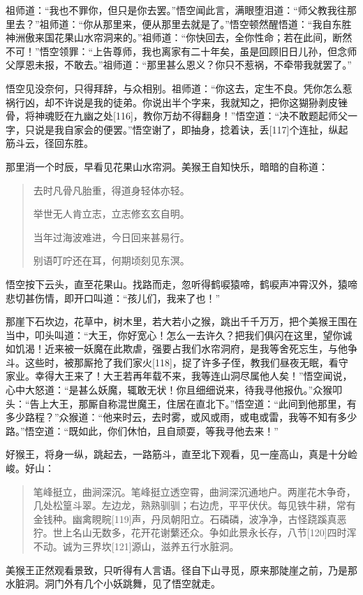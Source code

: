 \documentclass[12pt,UTF8]{ctexbook}
\begin{document}
祖师道：“我也不罪你，但只是你去罢。”悟空闻此言，满眼堕泪道：“师父教我往那里去？”祖师道：“你从那里来，便从那里去就是了。”悟空顿然醒悟道：“我自东胜神洲傲来国花果山水帘洞来的。”祖师道：“你快回去，全你性命；若在此间，断然不可！”悟空领罪：“上告尊师，我也离家有二十年矣，虽是回顾旧日儿孙，但念师父厚恩未报，不敢去。”祖师道：“那里甚么恩义？你只不惹祸，不牵带我就罢了。”

悟空见没奈何，只得拜辞，与众相别。祖师道：“你这去，定生不良。凭你怎么惹祸行凶，却不许说是我的徒弟。你说出半个字来，我就知之，把你这猢狲剥皮锉骨，将神魂贬在九幽之处[116]，教你万劫不得翻身！”悟空道：“决不敢题起师父一字，只说是我自家会的便罢。”悟空谢了，即抽身，捻着诀，丢[117]个连扯，纵起筋斗云，径回东胜。

那里消一个时辰，早看见花果山水帘洞。美猴王自知快乐，暗暗的自称道：
\begin{quotation}
去时凡骨凡胎重，得道身轻体亦轻。

举世无人肯立志，立志修玄玄自明。

当年过海波难进，今日回来甚易行。

别语叮咛还在耳，何期顷刻见东溟。
\end{quotation}
悟空按下云头，直至花果山。找路而走，忽听得鹤唳猿啼，鹤唳声冲霄汉外，猿啼悲切甚伤情，即开口叫道：“孩儿们，我来了也！”

那崖下石坎边，花草中，树木里，若大若小之猴，跳出千千万万，把个美猴王围在当中，叩头叫道：“大王，你好宽心！怎么一去许久？把我们俱闪在这里，望你诚如饥渴！近来被一妖魔在此欺虐，强要占我们水帘洞府，是我等舍死忘生，与他争斗。这些时，被那厮抢了我们家火[118]，捉了许多子侄，教我们昼夜无眠，看守家业。幸得大王来了！大王若再年载不来，我等连山洞尽属他人矣！”悟空闻说，心中大怒道：“是甚么妖魔，辄敢无状！你且细细说来，待我寻他报仇。”众猴叩头：“告上大王，那厮自称混世魔王，住居在直北下。”悟空道：“此间到他那里，有多少路程？”众猴道：“他来时云，去时雾，或风或雨，或电或雷，我等不知有多少路。”悟空道：“既如此，你们休怕，且自顽耍，等我寻他去来！”

好猴王，将身一纵，跳起去，一路筋斗，直至北下观看，见一座高山，真是十分崄峻。好山：
\begin{quotation}
笔峰挺立，曲涧深沉。笔峰挺立透空霄，曲涧深沉通地户。两崖花木争奇，几处松篁斗翠。左边龙，熟熟驯驯；右边虎，平平伏伏。每见铁牛耕，常有金钱种。幽禽睍睆[119]声，丹凤朝阳立。石磷磷，波净净，古怪跷蹊真恶狞。世上名山无数多，花开花谢蘩还众。争如此景永长存，八节[120]四时浑不动。诚为三界坎[121]源山，滋养五行水脏洞。
\end{quotation}
美猴王正然观看景致，只听得有人言语。径自下山寻觅，原来那陡崖之前，乃是那水脏洞。洞门外有几个小妖跳舞，见了悟空就走。
\end{document}
